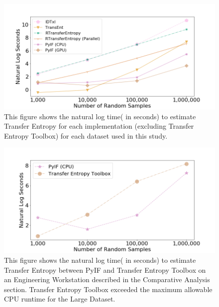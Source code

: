 \begin{figure}
  \centerline{\includegraphics[scale=0.8]{figures/PyIF/WallTime-TE.png}}
  \caption{This figure shows the natural log time( in seconds) to estimate Transfer Entropy for each implementation (excluding Transfer Entropy Toolbox) for each dataset used in this study. }
  \label{TE-walltime}
\end{figure}


\begin{figure}
  \centerline{\includegraphics[scale=0.8]{figures/PyIF/WallTime-TE2.png}}
  \caption{This figure shows the natural log time( in seconds) to estimate Transfer Entropy between PyIF and Transfer Entropy Toolbox on an Engineering Workstation described in the Comparative Analysis section. Transfer Entropy Toolbox exceeded the maximum allowable CPU runtime for the Large Dataset. }
  \label{TE-walltime2}
\end{figure}

\clearpage


